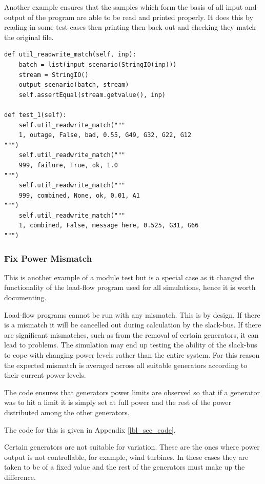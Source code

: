 \documentclass[a4paper,oneside,12pt]{report}
\begin{document}
Another example ensures that the samples which form the basis of all
input and output of the program are able to be read and printed
properly. It does this by reading in some test cases then printing then
back out and checking they match the original file.

\begin{verbatim}
def util_readwrite_match(self, inp):
    batch = list(input_scenario(StringIO(inp)))
    stream = StringIO()
    output_scenario(batch, stream)
    self.assertEqual(stream.getvalue(), inp)

def test_1(self):
    self.util_readwrite_match("""
    1, outage, False, bad, 0.55, G49, G32, G22, G12
""")
    self.util_readwrite_match("""
    999, failure, True, ok, 1.0
""")
    self.util_readwrite_match("""
    999, combined, None, ok, 0.01, A1
""")
    self.util_readwrite_match("""
    1, combined, False, message here, 0.525, G31, G66
""")
\end{verbatim}

\subsubsection{Fix Power Mismatch}

This is another example of a module test but is a special case as it
changed the functionality of the load-flow program used for all
simulations, hence it is worth documenting.

Load-flow programs cannot be run with any mismatch. This is by design.
If there is a mismatch it will be cancelled out during calculation by the
slack-bus. If there are significant mismatches, such as from the removal of
certain generators, it can lead to problems.
The simulation may end up testing the ability of the slack-bus to cope
with changing power levels rather than the entire system. For this reason
the expected mismatch is averaged across all suitable generators
according to their current power levels.

The code ensures that generators power limits are observed so that if a
generator was to hit a limit it is simply set at full power and the rest
of the power distributed among the other generators.

The code for this is given in Appendix \ref{lbl_sec_code}.

Certain generators are not suitable for variation. These are the ones
where power output is not controllable, for example, wind turbines. In
these cases they are taken to be of a fixed value and the rest of the
generators must make up the difference.
\end{document}
